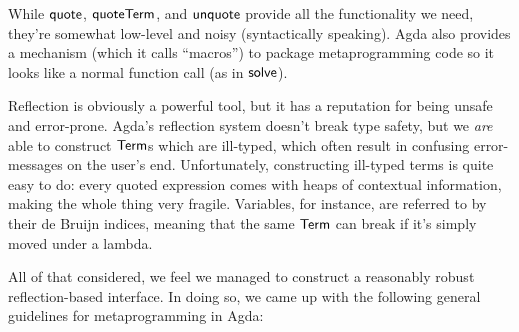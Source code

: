 \documentclass[acmsmall,review,anonymous]{acmart}\settopmatter{printfolios=true,printccs=false,printacmref=false}
\begin{document}
While \(\AgdaKeyword{quote}\), \(\AgdaKeyword{quoteTerm}\), and
\(\AgdaKeyword{unquote}\) provide all the functionality we need, they're
somewhat low-level and noisy (syntactically speaking). Agda also provides a
mechanism (which it calls ``macros'') to package metaprogramming code so it
looks like a normal function call (as in \(\AgdaMacro{solve}\)).

Reflection is obviously a powerful tool, but it has a reputation for being
unsafe and error-prone. Agda's reflection system doesn't break type safety, but
we \emph{are} able to construct \(\AgdaDatatype{Term}\)s which are ill-typed,
which often result in confusing error-messages on the user's end. Unfortunately,
constructing ill-typed terms is quite easy to do: every quoted expression comes
with heaps of contextual information, making the whole thing very fragile.
Variables, for instance, are referred to by their de Bruijn indices, meaning
that the same \(\AgdaDatatype{Term}\) can break if it's simply moved under a
lambda.

All of that considered, we feel we managed to construct a reasonably robust
reflection-based interface. In doing so, we came up with the following general
guidelines for metaprogramming in Agda:
\end{document}
